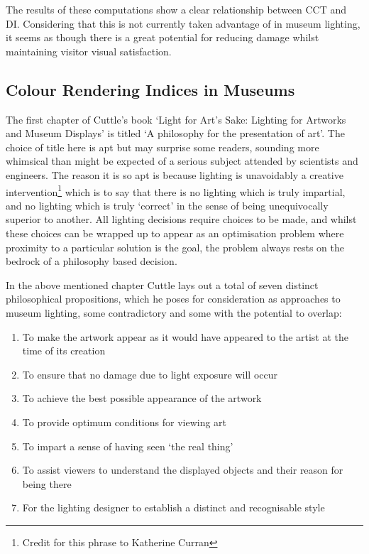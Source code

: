 The results of these computations show a clear relationship between \gls{CCT} and \gls{DI}. Considering that this is not currently taken advantage of in museum lighting, it seems as though there is a great potential for reducing damage whilst maintaining visitor visual satisfaction.



\clearpage

\subsection{Colour Rendering Indices in Museums}

The first chapter of Cuttle's book `Light for Art's Sake: Lighting for Artworks and Museum Displays' \citep{cuttle_light_2007} is titled `A philosophy for the presentation of art'. The choice of title here is apt but may surprise some readers, sounding more whimsical than might be expected of a serious subject attended by scientists and engineers. The reason it is so apt is because lighting is unavoidably a creative intervention\footnote{Credit for this phrase to Katherine Curran} which is to say that there is no lighting which is truly impartial, and no lighting which is truly `correct' in the sense of being unequivocally superior to another. All lighting decisions require choices to be made, and whilst these choices can be wrapped up to appear as an optimisation problem where proximity to a particular solution is the goal, the problem always rests on the bedrock of a philosophy based decision.

In the above mentioned chapter Cuttle lays out a total of seven distinct philosophical propositions, which he poses for consideration as approaches to museum lighting, some contradictory and some with the potential to overlap:

\begin{enumerate}
\item To make the artwork appear as it would have appeared to the artist at the time of its creation
\item To ensure that no damage due to light exposure will occur
\item To achieve the best possible appearance of the artwork
\item To provide optimum conditions for viewing art
\item To impart a sense of having seen `the real thing'
\item To assist viewers to understand the displayed objects and their reason for being there
\item For the lighting designer to establish a distinct and recognisable style
\end{enumerate}

